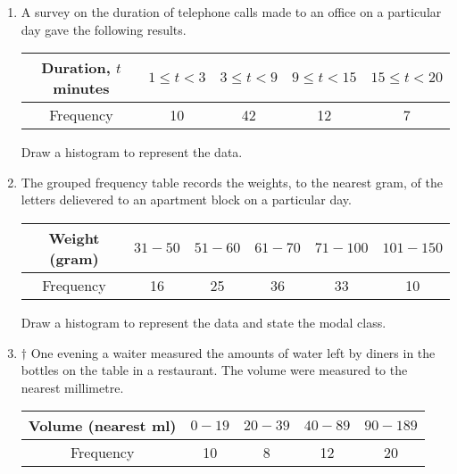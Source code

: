  \exercise  %

\begin{enumerate}
	\item A survey on the duration of telephone calls made to an office on a particular day gave the following results.
	
	\medskip
	
	\begin{tabular}{|c|c|c|c|c|}
		\hline
		Duration, $t$ minutes & $1 \leqslant t < 3$  & $3 \leqslant t < 9$ & $9 \leqslant t < 15$ & $15 \leqslant t < 20$  \\
		\hline
		Frequency & 10 & 42 & 12 & 7   \\
		\hline
	\end{tabular}
\smallskip

     Draw a histogram to represent the data.
     
     \item The grouped frequency table records the weights, to the nearest gram, of the letters delievered to an apartment block on a particular day.
     
     	\medskip
     
     \begin{tabular}{|c|c|c|c|c|c|}
     	\hline
     	Weight (gram) & $31-50$  & $51-60$ & $61-70$ & $71-100$ & $101-150$ \\
     	\hline
     	Frequency & 16 & 25 & 36 & 33 & 10   \\
     	\hline
     \end{tabular}
 \smallskip
 
 Draw a histogram to represent the data and state the modal class.
 
 \item $\dagger$ One evening a waiter measured the amounts of water left by diners in the bottles on the table in a restaurant. The volume were measured to the nearest millimetre.
 
 	\medskip
 
 \begin{tabular}{|c|c|c|c|c|}
 	\hline
 	Volume (nearest \si{\ml}) & $0-19$  & $20-39$ & $40-89$ & $90-189$  \\
 	\hline
 	Frequency & 10 & 8 & 12 & 20   \\
 	\hline
 \end{tabular}
 \smallskip
 

\end{enumerate}
